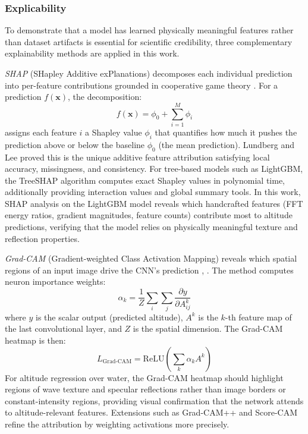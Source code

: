    \subsubsection{Explicability}

    To demonstrate that a model has learned physically meaningful features rather than dataset artifacts is essential for scientific credibility, three complementary explainability methods are applied in this work.

    \emph{SHAP} (SHapley Additive exPlanations) decomposes each individual prediction into per-feature contributions grounded in cooperative game theory \cite{Lundberg2017}. For a prediction $f(\mathbf{x})$, the decomposition:
    \begin{equation}
        f(\mathbf{x}) = \phi_0 + \sum_{i=1}^{M} \phi_i
        \label{eq:shap}
    \end{equation}
    assigns each feature $i$ a Shapley value $\phi_i$ that quantifies how much it pushes the prediction above or below the baseline $\phi_0$ (the mean prediction). Lundberg and Lee \cite{Lundberg2017} proved this is the unique additive feature attribution satisfying local accuracy, missingness, and consistency. For tree-based models such as LightGBM, the TreeSHAP algorithm \cite{Lundberg2020} computes exact Shapley values in polynomial time, additionally providing interaction values and global summary tools. In this work, SHAP analysis on the LightGBM model reveals which handcrafted features (FFT energy ratios, gradient magnitudes, feature counts) contribute most to altitude predictions, verifying that the model relies on physically meaningful texture and reflection properties.

    \emph{Grad-CAM} (Gradient-weighted Class Activation Mapping) reveals which spatial regions of an input image drive the CNN's prediction \cite{GradCAM2017}, \cite{GradCAM2020}. The method computes neuron importance weights:
    \begin{equation}
        \alpha_k = \frac{1}{Z} \sum_{i} \sum_{j} \frac{\partial y}{\partial A_{ij}^k}
        \label{eq:gradcam_weights}
    \end{equation}
    where $y$ is the scalar output (predicted altitude), $A^k$ is the $k$-th feature map of the last convolutional layer, and $Z$ is the spatial dimension. The Grad-CAM heatmap is then:
    \begin{equation}
        L_{\mathrm{Grad\text{-}CAM}} = \mathrm{ReLU}\left(\sum_k \alpha_k A^k\right)
        \label{eq:gradcam_heatmap}
    \end{equation}
    For altitude regression over water, the Grad-CAM heatmap should highlight regions of wave texture and specular reflections rather than image borders or constant-intensity regions, providing visual confirmation that the network attends to altitude-relevant features. Extensions such as Grad-CAM++ \cite{GradCAMPP2018} and Score-CAM \cite{ScoreCAM2020} refine the attribution by weighting activations more precisely.

